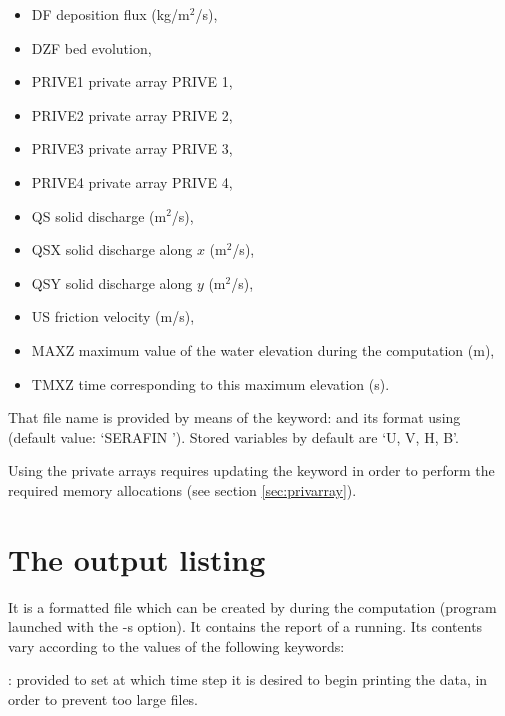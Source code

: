 \begin{itemize}
\item DF deposition flux (kg/m${}^{2}$/s),

\item DZF bed evolution,

\item PRIVE1 private array PRIVE 1,

\item PRIVE2 private array PRIVE 2,

\item PRIVE3 private array PRIVE 3,

\item PRIVE4 private array PRIVE 4,

\item QS  solid discharge (m${}^{2}$/s),

\item QSX  solid discharge along $x$ (m${}^{2}$/s),

\item QSY  solid discharge along $y$ (m${}^{2}$/s),

\item US  friction velocity (m/s),

\item MAXZ  maximum value of the water elevation during the computation (m),

\item TMXZ  time corresponding to this maximum elevation (s).
\end{itemize}

That file name is provided by means of the keyword:  and
its format using  (default value: `SERAFIN ').
Stored variables by default are `U, V, H, B'.

Using the private arrays requires updating the keyword  in order to perform the required memory allocations (see
section \ref{sec:privarray}).

\section{The output listing}

It is a formatted file which can be created by  during the
computation (program launched with the -s option). It contains the report of a
 running. Its contents vary according to the values of the following
keywords:

: provided to set at
which time step it is desired to begin printing the data, in order to prevent
too large files.

